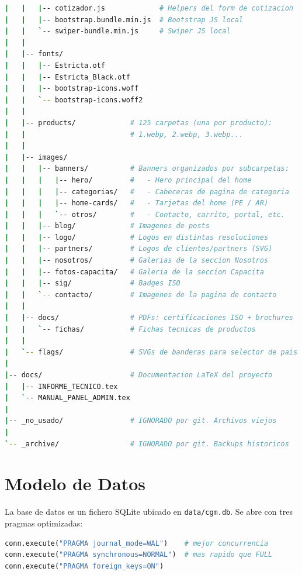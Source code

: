 \documentclass[11pt,a4paper]{article}
\begin{document}
\begin{lstlisting}[language=bash]
|   |   |-- cotizador.js             # Helpers del form de cotizacion
|   |   |-- bootstrap.bundle.min.js  # Bootstrap JS local
|   |   `-- swiper-bundle.min.js     # Swiper JS local
|   |
|   |-- fonts/
|   |   |-- Estricta.otf
|   |   |-- Estricta_Black.otf
|   |   |-- bootstrap-icons.woff
|   |   `-- bootstrap-icons.woff2
|   |
|   |-- products/             # 125 carpetas (una por producto):
|   |                         # 1.webp, 2.webp, 3.webp...
|   |
|   |-- images/
|   |   |-- banners/          # Banners organizados por subcarpetas:
|   |   |   |-- hero/         #   - Hero principal del home
|   |   |   |-- categorias/   #   - Cabeceras de pagina de categoria
|   |   |   |-- home-cards/   #   - Tarjetas del home (PE / AR)
|   |   |   `-- otros/        #   - Contacto, carrito, portal, etc.
|   |   |-- blog/             # Imagenes de posts
|   |   |-- logo/             # Logos en distintas resoluciones
|   |   |-- partners/         # Logos de clientes/partners (SVG)
|   |   |-- nosotros/         # Galerias de la seccion Nosotros
|   |   |-- fotos-capacita/   # Galeria de la seccion Capacita
|   |   |-- sig/              # Badges ISO
|   |   `-- contacto/         # Imagenes de la pagina de contacto
|   |
|   |-- docs/                 # PDFs: certificaciones ISO + brochures
|   |   `-- fichas/           # Fichas tecnicas de productos
|   |
|   `-- flags/                # SVGs de banderas para selector de pais
|
|-- docs/                     # Documentacion LaTeX del proyecto
|   |-- INFORME_TECNICO.tex
|   `-- MANUAL_PANEL_ADMIN.tex
|
|-- _no_usado/                # IGNORADO por git. Archivos viejos
|
`-- _archive/                 # IGNORADO por git. Backups historicos
\end{lstlisting}

\section{Modelo de Datos}

La base de datos es un fichero SQLite ubicado en \texttt{data/cgm.db}. Se abre
con tres pragmas optimizadas:

\begin{lstlisting}[language=Python]
conn.execute("PRAGMA journal_mode=WAL")    # mejor concurrencia
conn.execute("PRAGMA synchronous=NORMAL")  # mas rapido que FULL
conn.execute("PRAGMA foreign_keys=ON")
\end{lstlisting}
\end{document}
